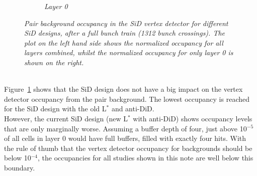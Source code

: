 \begin{figure}[!h]
\begin{subfigure}[t]{0.45\textwidth}
\caption{\textit{Layer 0}}
\end{subfigure}
\caption{\textit{Pair background occupancy in the SiD vertex detector for different SiD designs, after a full bunch train (1312 bunch crossings).
The plot on the left hand side shows the normalized occupancy for all layers combined, whilst the normalized occupancy for only layer 0 is shown on the right.}}
\label{fig:SiD_comparison}
\end{figure}
\\Figure~\ref{fig:SiD_comparison} shows that the SiD design does not have a big impact on the vertex detector occupancy from the pair background. 
The lowest occupancy is reached for the SiD design with the old L$^*$ and anti-DiD.\\
However, the current SiD design (new L$^*$ with anti-DiD) shows occupancy levels that are only marginally worse.
Assuming a buffer depth of four, just above 10$^{-5}$ of all cells in layer 0 would have full buffers, filled with exactly four hits.
With the rule of thumb that the vertex detector occupancy for backgrounds should be below 10$^{-4}$, the occupancies for all studies shown in this note are well below this boundary.